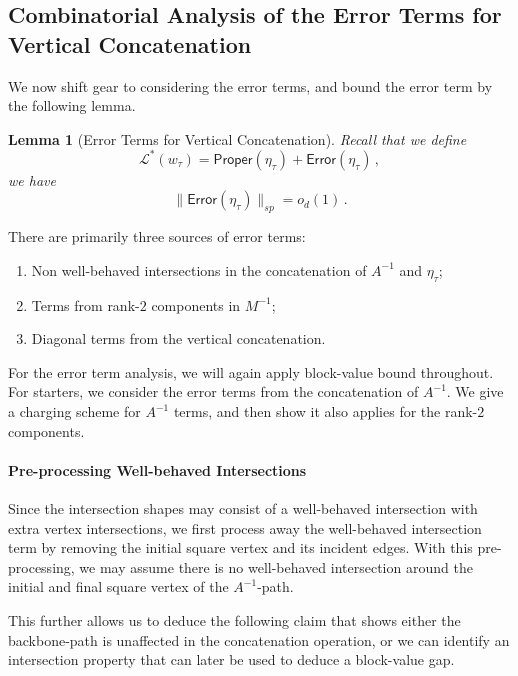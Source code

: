 \documentclass[12pt]{article}
\newtheorem{lemma}[theorem]{Lemma}
\begin{document}
\subsection{Combinatorial Analysis of the Error Terms for Vertical Concatenation}%
\label{sec:vertical-details}

We now shift gear to considering the error terms, and bound the error term by the following lemma.
\begin{lemma}[Error Terms for Vertical Concatenation] \label{lem:error-vertical}
	Recall that we define 
	\[ 
	\mathcal{L}^*(w_\tau) = \mathsf{Proper}(\eta_\tau) + \mathsf{Error}(\eta_\tau)\,,
	\]
	we have \[ 
	 \|\mathsf{Error}(\eta_\tau)\|_{sp}=o_d(1)\,.
	\]
\end{lemma}

 There are primarily three sources of error terms:\begin{enumerate}
	\item Non well-behaved intersections in the concatenation of $A^{-1}$ and $\eta_\tau$;
	\item Terms from rank-$2$ components in $M^{-1}$;
	\item Diagonal terms from the vertical concatenation.
\end{enumerate}
For the error term analysis, we will again apply block-value bound throughout.
For starters, we consider the error terms from the concatenation of $A^{-1}$. We give a charging scheme for $A^{-1}$ terms, and then show it also applies for the rank-$2$ components.

\paragraph{Pre-processing Well-behaved Intersections} Since the intersection shapes may consist of a well-behaved intersection with extra vertex intersections, we first process away the well-behaved intersection term by removing the initial square vertex and its incident edges. With this pre-processing, we may assume there is no well-behaved intersection around the initial and final square vertex of the $A^{-1}$-path.

 This further allows us to deduce the following claim that shows either the backbone-path is unaffected in the concatenation operation, or we can identify an intersection property that can later be used to deduce a block-value gap.
\end{document}
